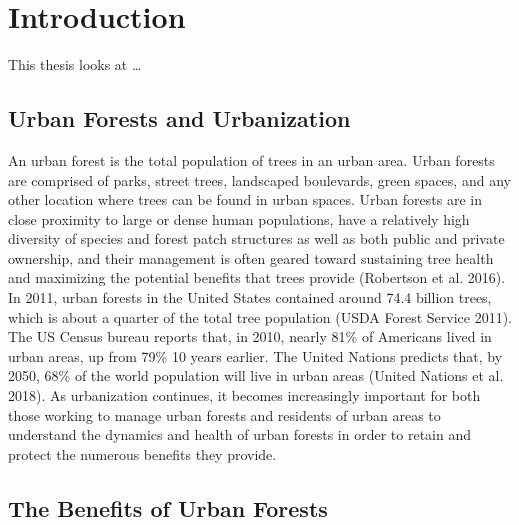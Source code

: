 \documentclass[12pt,twoside]{reedthesis}
\begin{document}
\hypertarget{intro}{%
\chapter{Introduction}\label{intro}}

This thesis looks at \ldots{}

\hypertarget{urban-forests-and-urbanization}{%
\section{Urban Forests and Urbanization}\label{urban-forests-and-urbanization}}

An urban forest is the total population of trees in an urban area. Urban
forests are comprised of parks, street trees, landscaped boulevards,
green spaces, and any other location where trees can be found in urban
spaces. Urban forests are in close proximity to large or dense human
populations, have a relatively high diversity of species and forest
patch structures as well as both public and private ownership, and their
management is often geared toward sustaining tree health and maximizing
the potential benefits that trees provide (Robertson et al. 2016). In 2011,
urban forests in the United States contained around 74.4 billion trees,
which is about a quarter of the total tree population
(USDA Forest Service 2011). The US Census bureau reports that, in 2010,
nearly 81\% of Americans lived in urban areas, up from 79\% 10 years
earlier. The United Nations predicts that, by 2050, 68\% of the world
population will live in urban areas (United Nations et al. 2018). As
urbanization continues, it becomes increasingly important for both those
working to manage urban forests and residents of urban areas to
understand the dynamics and health of urban forests in order to retain
and protect the numerous benefits they provide.

\hypertarget{the-benefits-of-urban-forests}{%
\section{The Benefits of Urban Forests}\label{the-benefits-of-urban-forests}}
\end{document}
